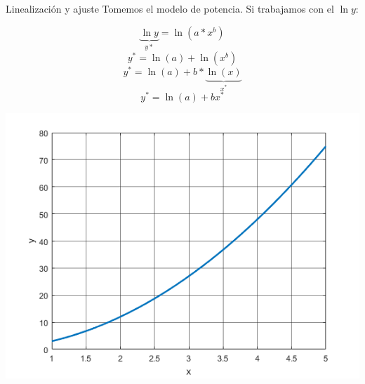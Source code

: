 \documentclass[xcolor=svgnames]{beamer} %
\theoremstyle{plain}
\theoremstyle{definition}
\begin{document}
\begin{frame}{Linealización y ajuste}
  Tomemos el modelo de potencia. Si trabajamos con el $\ln{y}$:
  \begin{minipage}{.45\linewidth}
    $$ \underbrace{\ln{y}}_{y*} = \ln (a * x^b) $$
    $$y^* = \ln(a) + \ln(x^b) $$
    $$ y^* = \ln(a) + b*\underbrace{\ln (x)}_{x^*} $$
    $$ y^* = \ln(a) + b x^*$$
  \end{minipage} \begin{minipage}{.45\linewidth}
    \includegraphics[scale=.3]{lin/pot.png} 
    
  \end{minipage}

\end{frame}
\end{document}
